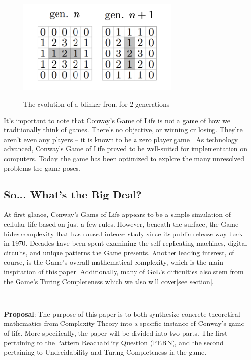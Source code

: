 \documentclass{article}
\theoremstyle{definition}
\theoremstyle{plain}
\theoremstyle{plain}
\begin{document}
 \begin{figure}[ht]
          \centering
    \includegraphics[width=8cm]{figures/figure_one.png}
    \caption{The evolution of a blinker from for 2 generations}
    \label{figure_one}
    \cite{Bontes2019}
\end{figure}

It’s important to note that Conway’s Game of Life is not a game of how we traditionally think of games. There’s no objective, or winning or losing. They’re aren’t even any players – it is known to be a zero player game \cite{Beginning_Life_2006}. As technology advanced, Conway’s Game of Life proved to be well-suited for implementation on computers. Today, the game has been optimized to explore the many unresolved problems the game poses. 

\subsection{So... What's the Big Deal?}

At first glance, Conway’s Game of Life appears to be a simple simulation of cellular life based on just a few rules. However, beneath the surface, the Game hides complexity that has roused intense study since its public release way back in 1970. Decades have been spent examining the self-replicating machines, digital circuits, and unique patterns the Game presents. Another leading interest, of course, is the Game's overall mathematical complexity, which is the main inspiration of this paper. Additionally, many of GoL's difficulties also stem from the Game's Turing Completeness which we also will cover[see section]. 

\ 

\textbf{Proposal}: The purpose of this paper is to both synthesize concrete theoretical mathematics from Complexity Theory into a specific instance of Conway's game of life. More specifically, the paper will be divided into two parts. The first pertaining to the Pattern Reachability Question (PERN), and the second pertaining to Undecidability and Turing Completeness in the game.
\end{document}
